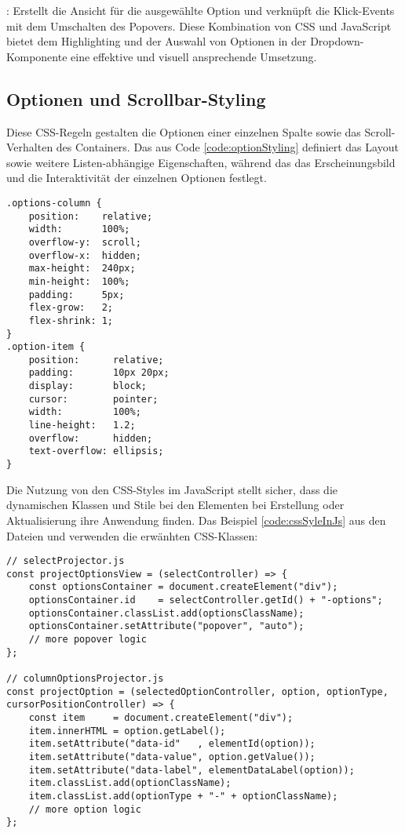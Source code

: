 : Erstellt die Ansicht für die ausgewählte Option und verknüpft die Klick-Events mit dem Umschalten des Popovers.
Diese Kombination von CSS und JavaScript bietet dem Highlighting und der Auswahl von Optionen in der Dropdown-Komponente eine effektive und visuell ansprechende Umsetzung.


\subsection{Optionen und Scrollbar-Styling}
\label{sec:sizeLayoutChanges}

Diese CSS-Regeln gestalten die Optionen einer einzelnen Spalte sowie das Scroll-Verhalten des Containers. 
Das  aus Code \ref{code:optionStyling} definiert das Layout sowie weitere Listen-abhängige Eigenschaften, 
während das  das Erscheinungsbild und die Interaktivität der einzelnen Optionen festlegt.

\begin{lstlisting}[style = htmlcssjs, caption = Optionen und Scrollbar-Styling, label = code:optionStyling]
.options-column {
    position:    relative;
    width:       100%;
    overflow-y:  scroll;
    overflow-x:  hidden;
    max-height:  240px;
    min-height:  100%;
    padding:     5px;
    flex-grow:   2;
    flex-shrink: 1;
}
.option-item {
    position:      relative;
    padding:       10px 20px;
    display:       block;
    cursor:        pointer;
    width:         100%;
    line-height:   1.2;
    overflow:      hidden;
    text-overflow: ellipsis;
} 
\end{lstlisting}

Die Nutzung von den CSS-Styles im JavaScript stellt sicher, dass die dynamischen Klassen und Stile bei den Elementen bei Erstellung oder Aktualisierung ihre Anwendung finden.
Das Beispiel \ref{code:cssSyleInJs} aus den Dateien  und  verwenden die erwänhten CSS-Klassen:

\begin{lstlisting}[style = htmlcssjs, caption = CSS-Styles im JavaScript, label = code:cssSyleInJs]
// selectProjector.js
const projectOptionsView = (selectController) => {
    const optionsContainer = document.createElement("div");
    optionsContainer.id    = selectController.getId() + "-options";
    optionsContainer.classList.add(optionsClassName);
    optionsContainer.setAttribute("popover", "auto");
    // more popover logic
};

// columnOptionsProjector.js
const projectOption = (selectedOptionController, option, optionType, cursorPositionController) => {
    const item     = document.createElement("div");
    item.innerHTML = option.getLabel();
    item.setAttribute("data-id"   , elementId(option));
    item.setAttribute("data-value", option.getValue());
    item.setAttribute("data-label", elementDataLabel(option));
    item.classList.add(optionClassName);
    item.classList.add(optionType + "-" + optionClassName);
    // more option logic
}; 
\end{lstlisting}

